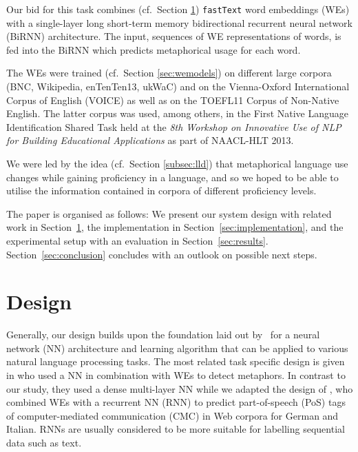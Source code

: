 \documentclass[11pt,a4paper]{article}
\newcommand\fT{\texttt{fastText}\xspace}
\begin{document}
Our bid for this task combines (cf.~Section \ref{sec:design}) \fT word embeddings (WEs) with a single-layer long short-term memory bidirectional recurrent neural network (BiRNN) architecture.
The input, sequences of WE representations of words, is fed into the BiRNN which predicts metaphorical usage for each word. 

The WEs were trained (cf.~Section \ref{sec:wemodels}) on different large corpora (BNC, Wikipedia, enTenTen13, ukWaC) and on the Vienna-Oxford International Corpus of English (VOICE) as well as on the TOEFL11 Corpus of Non-Native English. The latter corpus was used, among others, in the First Native Language Identification Shared Task \cite{tetreault-blanchard-cahill:2013:BEA} held at the \emph{8th Workshop on Innovative Use of NLP for Building Educational Applications} as part of NAACL-HLT 2013.

We were led by the idea (cf.~Section \ref{subsec:lld}) that metaphorical language use changes while gaining proficiency in a language, and so we hoped to be able to utilise the information contained in corpora of different proficiency levels.

The paper is organised as follows: We present our system design with related work in
Section~\ref{sec:design}, the implementation in
Section~\ref{sec:implementation}, and the experimental setup with an evaluation in
Section~\ref{sec:results}. 
Section~\ref{sec:conclusion} concludes with an outlook on possible next steps.



\section{Design} %
\label{sec:design}

Generally, our design builds upon the foundation laid out by~ for a neural network (NN) architecture and learning algorithm that can be applied to various natural language processing tasks.
The most related task specific design is given in  who used a NN in combination with WEs to detect metaphors. 
In contrast to our study, they used a dense multi-layer NN while we adapted the design of , who combined WEs with a recurrent NN (RNN) to predict part-of-speech (PoS) tags of computer-mediated communication (CMC) in Web corpora for German and Italian.
RNNs are usually considered to be more suitable for labelling sequential data such as text.
\end{document}
